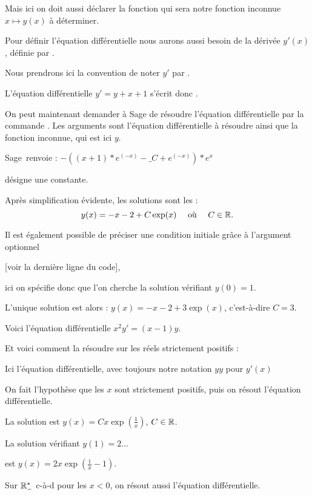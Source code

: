 \change
Mais ici on doit aussi déclarer la fonction qui sera notre fonction inconnue $x \mapsto y(x)$ à déterminer.

\change
Pour définir l'équation différentielle nous aurons aussi besoin de la dérivée $y'(x)$, définie 
par  . 

Nous prendrons ici la convention de noter $y'$ par .

\change
L'équation différentielle $y' = y + x + 1$
s'écrit donc .

On peut maintenant demander à Sage de résoudre l'équation différentielle par la commande  
. Les arguments sont  
l'équation différentielle à résoudre ainsi que la fonction inconnue, qui est ici $y$. 

\change
Sage\ renvoie : $-\left((x + 1)*e^{(-x)} - \_C + e^{(-x)}\right)*e^x$

\change
{} désigne une constante.

\change
Après simplification évidente, les solutions sont les :
$$y(x) = -x-2 + C \exp(x) \quad \text{ où } \quad C \in \mathbb{R}.$$

\change
Il est également possible de préciser une condition 
initiale grâce à l'argument optionnel  

[voir la dernière ligne du code], 

ici on 
spécifie donc que l'on cherche la solution vérifiant $y(0)=1$.


\change
L'unique solution est alors : $y(x) = -x-2 + 3\exp(x)$, c'est-à-dire $C=3$.

\diapo 

Voici l'équation différentielle $x^2y' = (x-1)y$.

\change
Et voici comment la résoudre sur les réels strictement positifs :



Ici l'équation différentielle, avec toujours notre notation $yy$ pour $y'(x)$

On fait l'hypothèse que les $x$ sont strictement positifs, puis on résout l'équation différentielle.

\change
La solution est $y(x) = Cx \exp(\frac1x)$, $C\in \mathbb{R}$.
  

\change 
La solution vérifiant $y(1)=2$...


\change
est $y(x) = 2x \exp(\frac1x - 1)$.

\change
Sur $\mathbb{R}_-^*$ c-à-d pour les $x<0$, 
on résout aussi l'équation différentielle.

